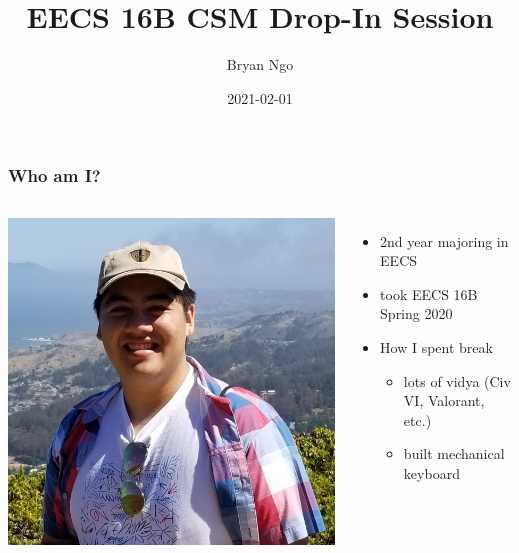 \documentclass[aspectratio=169]{beamer}
\title{EECS 16B CSM Drop-In Session}
\author{Bryan Ngo}
\date{2021-02-01}
\institute{Computer Science Mentors}
\begin{document}
\begin{frame}
    \maketitle
\end{frame}

\begin{frame}
    \frametitle{Who am I?}

    \begin{columns}
        \includegraphics[width=0.8\textheight]{bryan_ngo.png}

        \begin{itemize}
            \item 2nd year majoring in EECS
            \item took EECS 16B Spring 2020
            \item How I spent break
            \begin{itemize}
                \item lots of vidya (Civ VI, Valorant, etc.)
                \item built mechanical keyboard
            \end{itemize}
        \end{itemize}
    \end{columns}
\end{frame}
\end{document}
